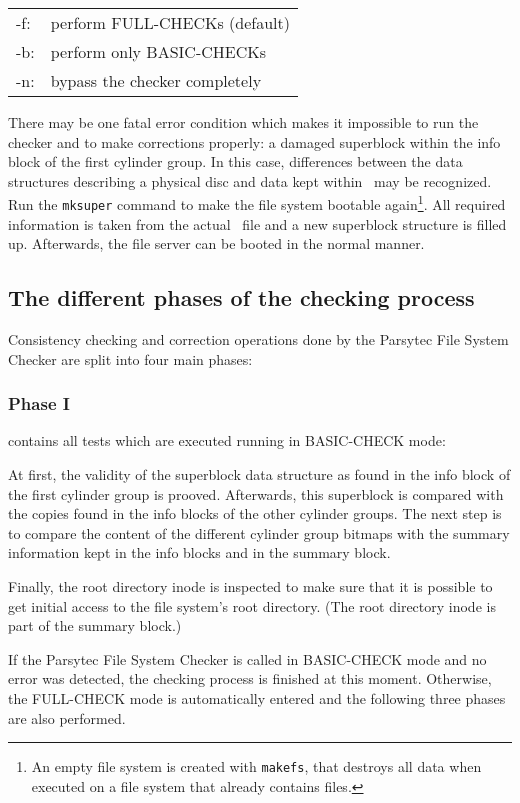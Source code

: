 \begin{tabular}{ll}
  -f: & perform FULL-CHECKs (default) \\
  -b: & perform only BASIC-CHECKs     \\
  -n: & bypass the checker completely \\
\end{tabular}

There may be one fatal error condition which makes it impossible to run the 
checker and to make corrections properly: a damaged superblock within the 
info block of the first cylinder group. In this case, differences between the 
data structures describing a physical disc and data kept within \DI\ may be
recognized. Run the {\tt mksuper} command to make the file system bootable
again\footnote{An empty file system is created with {\tt makefs}, that
destroys all data when executed on a file system that already contains
files.}. All required information is taken from the actual \DI\ file and a new
superblock structure is filled up. Afterwards, the file server can be booted
in the normal manner.

\subsection{The different phases of the checking process}

Consistency checking and correction operations done by the Parsytec File 
System Checker are split into four main phases:


\subsubsection{Phase I}
contains all tests which are executed running in
BASIC-CHECK mode:

At first, the validity of the superblock data structure as found in the 
info block of the first cylinder group is prooved. Afterwards, this superblock 
is compared with the copies found in the info blocks of the other cylinder 
groups. The next step is to compare the content of the different cylinder 
group bitmaps with the summary information kept in the info blocks and in the
summary block.

Finally, the root directory inode is inspected to make sure that it is 
possible to get initial access to the file system's root directory. (The root 
directory inode is part of the summary block.)

If the Parsytec File System Checker is called in BASIC-CHECK mode and no error 
was detected, the checking process is finished at this moment. Otherwise, the 
FULL-CHECK mode is automatically entered and the following three phases are 
also performed.

